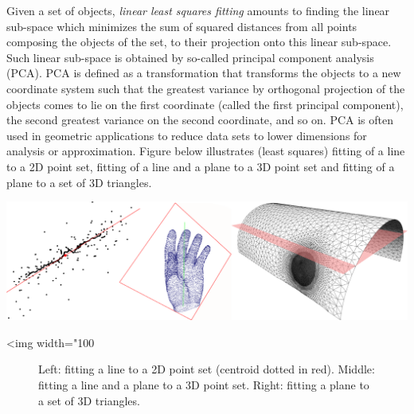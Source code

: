 Given a set of objects, \emph{linear least squares fitting} amounts to finding the linear sub-space which minimizes the sum of squared distances from all points composing the objects of the set, to their projection onto this linear sub-space. Such linear sub-space is obtained by so-called principal component analysis (PCA). PCA is defined as a transformation that transforms the objects to a new coordinate system such that the greatest variance by orthogonal projection of the objects comes to lie on the first coordinate (called the first principal component), the second greatest variance on the second coordinate, and so on. PCA is often used in geometric applications to reduce data sets to lower dimensions for analysis or approximation. Figure below illustrates (least squares) fitting of a line to a 2D point set, fitting of a line and a plane to a 3D point set and fitting of a plane to a set of 3D triangles. 

\begin{center}
    \label{fit}
    \begin{ccTexOnly}
      \includegraphics[width=1.0\textwidth]{Principal_component_analysis/fit}
    \end{ccTexOnly}
    \begin{ccHtmlOnly}
        <img width="100%
    \end{ccHtmlOnly}
    \begin{figure}[h]
        \caption{Left: fitting a line to a 2D point set (centroid dotted in red).
                 Middle: fitting a line and a plane to a 3D point set.
                 Right: fitting a plane to a set of 3D triangles.}
    \end{figure}
\end{center}

